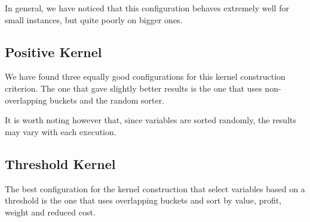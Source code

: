 In general, we have noticed that this configuration behaves extremely well for small instances, but quite poorly on
bigger ones.

\subsection{Positive Kernel}
We have found three equally good configurations for this kernel construction criterion.
The one that gave slightly better results is the one that uses non-overlapping buckets and the random sorter.

It is worth noting however that, since variables are sorted randomly, the results may vary with each execution.

\subsection{Threshold Kernel}
The best configuration for the kernel construction that select variables based on a threshold is the one that uses
overlapping buckets and sort by value, profit, weight and reduced cost.
